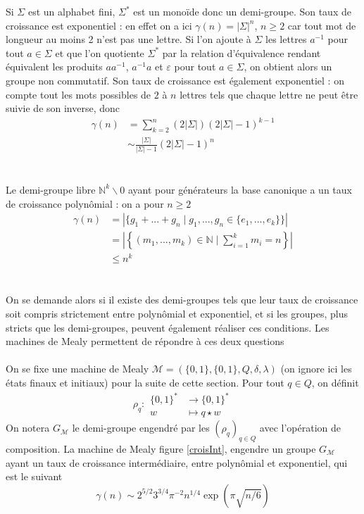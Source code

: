 \documentclass{scrartcl}
\begin{document}
\begin{flushleft}
Si $\Sigma$ est un alphabet fini, $\Sigma^*$ est un monoïde donc un demi-groupe. Son taux de croissance est exponentiel : en effet
on a ici $\gamma(n) = |\Sigma|^n$, $n \geq 2$ car tout mot de longueur au moins 2 n'est pas une lettre. Si l'on ajoute à $\Sigma$
les lettres $a^{-1}$ pour tout $a \in \Sigma$ et que l'on quotiente $\Sigma^*$ par la relation d'équivalence rendant équivalent les produits $aa^{-1}$,
$a^{-1}a$ et $\varepsilon$ pour tout $a \in \Sigma$, on obtient alors un groupe non commutatif. Son taux de croissance est également exponentiel :
on compte tout les mots possibles de $2$ à $n$ lettres tels que chaque lettre ne peut être suivie de son inverse, donc
\begin{align*}
    \gamma(n) &= \sum_{k=2}^n (2|\Sigma|)(2|\Sigma|-1)^{k-1}\\
    &\sim \frac{|\Sigma|}{|\Sigma|-1}(2|\Sigma|-1)^n
\end{align*}
\\~\\
Le demi-groupe libre $\mathbb{N}^k \backslash 0$ ayant pour générateurs la base canonique a un taux de croissance polynômial : on a pour $n \geq 2$
\begin{align*}
    \gamma(n) &= |\{g_1 + ... + g_n \mid g_1, ..., g_n \in \{ e_1, ..., e_k \} \}|\\
    &= \left| \left\{ (m_1, ..., m_k) \in \mathbb{N} \mid \sum_{i=1}^k m_i = n 
    \right\} \right|\\
    &\leq n^k
\end{align*}
\\~\\
On se demande alors si il existe des demi-groupes tels que leur taux de croissance soit compris strictement entre polynômial et exponentiel, et si
les groupes, plus stricts que les demi-groupes, peuvent également réaliser ces conditions.
Les machines de Mealy permettent de répondre à ces deux questions
\\~\\
On se fixe une machine de Mealy $\mathcal{M} = (\{0, 1\}, \{0, 1\}, Q, \delta, \lambda)$ (on ignore ici les états finaux et initiaux)
pour la suite de cette section. Pour tout $q \in Q$, on définit
\[ \rho_q : \begin{array}{cl}
    \{0, 1\}^* &\longrightarrow \{0, 1\}^*\\
    w &\longmapsto q \star w 
\end{array} \]
On notera $G_{\mathcal{M}}$ le demi-groupe engendré par les $(\rho_q)_{q \in Q}$ avec l'opération de composition. La machine de Mealy figure
\ref{croisInt},
engendre un groupe $G_{\mathcal{M}}$ ayant un taux de croissance intermédiaire, entre polynômial et exponentiel, qui est le suivant \cite{intGrowth}
\[ \gamma(n) \sim 2^{5/2}3^{3/4}\pi^{-2}n^{1/4}\exp(\pi\sqrt{n/6}) \]


\end{flushleft}
\end{document}
